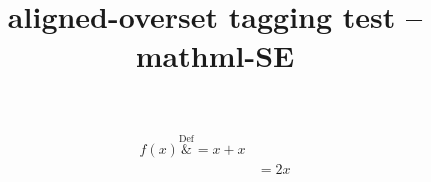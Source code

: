 \documentclass{article}
\title{aligned-overset tagging test -- mathml-SE}
\begin{document}
\begin{align}
f(x)\overset{\text{Def}}&=x+x\\
&=2x
\end{align}
\end{document}
